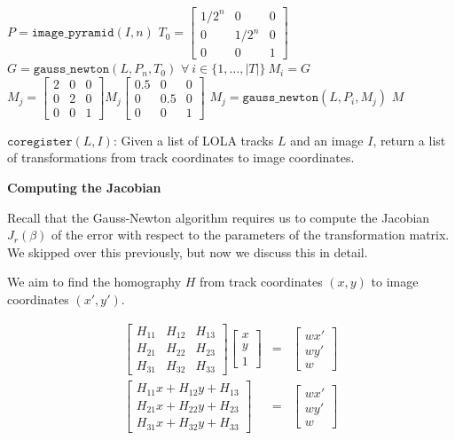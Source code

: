 \begin{algorithm}
	\begin{algorithmic}
		\STATE $P = \texttt{image\_pyramid}(I, n)$
		\STATE $T_0 = \left[\begin{array}{ccc}1/2^n&0&0\\0&1/2^n&0\\0&0&1\end{array}\right]$
		\STATE $G = \texttt{gauss\_newton}(L, P_{n}, T_0)$
		\STATE $\forall~i\in\{1,\ldots,|T|\}~M_i = G$
			\STATE $M_j = \left[\begin{array}{ccc}2&0&0\\0&2&0\\0&0&1\end{array}\right] M_j
				\left[\begin{array}{ccc}0.5&0&0\\0&0.5&0\\0&0&1\end{array}\right]$
			\STATE $M_j = \texttt{gauss\_newton}(L, P_{i}, M_j)$
			\ENDFOR
		\ENDFOR
		\RETURN $M$
	\end{algorithmic}
	\caption{$\texttt{coregister}(L, I)$: Given a list of LOLA tracks $L$ and an image $I$,
		return a list of transformations from track coordinates to image coordinates.}
	\label{alg:coregister}
\end{algorithm}

{\bf Computing the Jacobian}

Recall that the Gauss-Newton algorithm requires us to compute the Jacobian $J_r(\beta)$ of the error
with respect to the parameters of the transformation matrix. We skipped over this
previously, but now we discuss this in detail.

We aim to find the homography $H$ from track coordinates $(x, y)$ to image coordinates $(x', y')$.

\begin{eqnarray*}
\left[\begin{array}{ccc}
H_{11} & H_{12} & H_{13}\\
H_{21} & H_{22} & H_{23}\\
H_{31} & H_{32} & H_{33}
\end{array}\right]
\left[\begin{array}{c}x\\y\\1\end{array}\right] &=&
\left[\begin{array}{c}wx'\\wy'\\w\end{array}\right]\\
\left[\begin{array}{c}
H_{11}x + H_{12}y + H_{13}\\
H_{21}x + H_{22}y + H_{23}\\
H_{31}x + H_{32}y + H_{33}
\end{array}\right]
&=& \left[\begin{array}{c}wx'\\wy'\\w\end{array}\right]
\end{eqnarray*}

